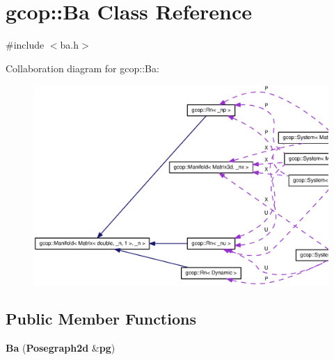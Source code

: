 \section{gcop\-:\-:\-Ba \-Class \-Reference}
\label{classgcop_1_1Ba}


{\ttfamily \#include $<$ba.\-h$>$}



\-Collaboration diagram for gcop\-:\-:\-Ba\-:
\nopagebreak
\begin{figure}[H]
\begin{center}
\leavevmode
\includegraphics[width=350pt]{classgcop_1_1Ba__coll__graph}
\end{center}
\end{figure}
\subsection*{\-Public \-Member \-Functions}
\begin{DoxyCompactItemize}
\item 
{\bf \-Ba} ({\bf \-Posegraph2d} \&{\bf pg})
\end{DoxyCompactItemize}
